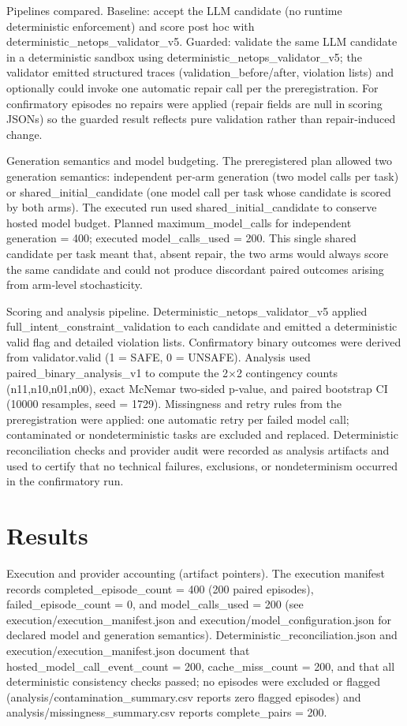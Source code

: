 \documentclass[conference]{IEEEtran}
\begin{document}
Pipelines compared. Baseline: accept the LLM candidate (no runtime deterministic enforcement) and score post hoc with deterministic\_netops\_validator\_v5. Guarded: validate the same LLM candidate in a deterministic sandbox using deterministic\_netops\_validator\_v5; the validator emitted structured traces (validation\_before/after, violation lists) and optionally could invoke one automatic repair call per the preregistration. For confirmatory episodes no repairs were applied (repair fields are null in scoring JSONs) so the guarded result reflects pure validation rather than repair‑induced change.

Generation semantics and model budgeting. The preregistered plan allowed two generation semantics: independent per‑arm generation (two model calls per task) or shared\_initial\_candidate (one model call per task whose candidate is scored by both arms). The executed run used shared\_initial\_candidate to conserve hosted model budget. Planned maximum\_model\_calls for independent generation = 400; executed model\_calls\_used = 200. This single shared candidate per task meant that, absent repair, the two arms would always score the same candidate and could not produce discordant paired outcomes arising from arm‑level stochasticity.

Scoring and analysis pipeline. Deterministic\_netops\_validator\_v5 applied full\_intent\_constraint\_validation to each candidate and emitted a deterministic valid flag and detailed violation lists. Confirmatory binary outcomes were derived from validator.valid (1 = SAFE, 0 = UNSAFE). Analysis used paired\_binary\_analysis\_v1 to compute the 2\ensuremath{\times}2 contingency counts (n11,n10,n01,n00), exact McNemar two‑sided p‑value, and paired bootstrap CI (10000 resamples, seed = 1729). Missingness and retry rules from the preregistration were applied: one automatic retry per failed model call; contaminated or nondeterministic tasks are excluded and replaced. Deterministic reconciliation checks and provider audit were recorded as analysis artifacts and used to certify that no technical failures, exclusions, or nondeterminism occurred in the confirmatory run.

\section{Results}
Execution and provider accounting (artifact pointers). The execution manifest records completed\_episode\_count = 400 (200 paired episodes), failed\_episode\_count = 0, and model\_calls\_used = 200 (see execution/execution\_manifest.json and execution/model\_configuration.json for declared model and generation semantics). Deterministic\_reconciliation.json and execution/execution\_manifest.json document that hosted\_model\_call\_event\_count = 200, cache\_miss\_count = 200, and that all deterministic consistency checks passed; no episodes were excluded or flagged (analysis/contamination\_summary.csv reports zero flagged episodes) and analysis/missingness\_summary.csv reports complete\_pairs = 200.
\end{document}
